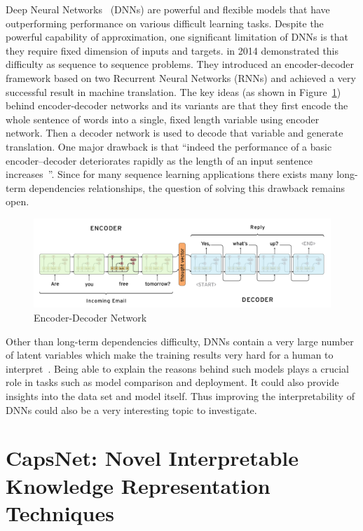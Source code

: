 \documentclass{article} \usepackage{tabularx}
\renewcommand{\citename}{\citet} \renewcommand{\cite}{\citep}
\begin{document}
Deep Neural Networks~\cite{goodfellow2016deep} (DNNs) are
powerful and flexible models that have outperforming performance
on various difficult learning tasks. Despite the powerful
capability of approximation, one significant limitation of DNNs
is that they require fixed dimension of inputs and targets.
\citename{sutskever2014sequence} in 2014 demonstrated this
difficulty as sequence to sequence problems. They introduced an
encoder-decoder framework based on two Recurrent Neural Networks
(RNNs) and achieved a very successful result in machine
translation. The key ideas (as shown in Figure~\ref{fig:en-de})
behind encoder-decoder networks and its variants are that they
first encode the whole sentence of words into a single, fixed
length variable using encoder network. Then a decoder network is
used to decode that variable and generate translation. One major
drawback is that ``indeed the performance of a basic
encoder–decoder deteriorates rapidly as the length of an input
sentence increases~\cite{attention}''. Since for many sequence
learning applications there exists many long-term dependencies
relationships, the question of solving this drawback remains
open.

\begin{figure}[H]
  \centering
  \includegraphics[scale=0.5]{images/en-de.png}
  \caption{Encoder-Decoder Network}
  \label{fig:en-de}
\end{figure}

Other than long-term dependencies difficulty, DNNs contain a very
large number of latent variables which make the training results
very hard for a human to interpret~\cite{goodfellow2016deep}.
Being able to explain the reasons behind such models plays a
crucial role in tasks such as model comparison and deployment. It
could also provide insights into the data set and model itself.
Thus improving the interpretability of DNNs could also be a very
interesting topic to investigate.

\section{CapsNet: Novel Interpretable Knowledge Representation
  Techniques}
\label{sec:caps_intro}
\end{document}
